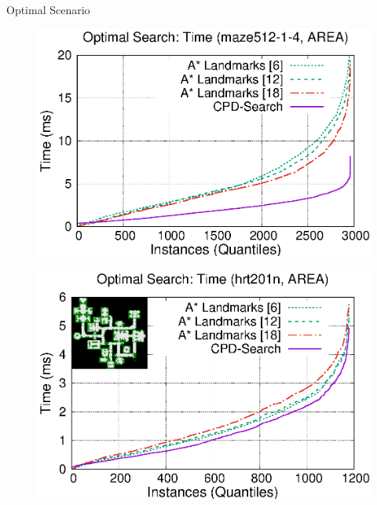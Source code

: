 \begin{frame}{Optimal Scenario}
    \begin{adjustwidth}{-2.5em}{-2.5em}
        \begin{minipage}{0.59\textwidth}
            \begin{figure}
                \centering
                \includegraphics[width=1.0\textwidth]{src/images/optimal/maze512-1-4}
                \label{fig:optimal-maze512-1-4}
            \end{figure}
        \end{minipage}%
        \begin{minipage}{0.59\textwidth}
            \begin{figure}
                \centering
                \includegraphics[width=1.0\textwidth]{src/images/optimal/hrt201n}
                \label{fig:optimal-hrt201n}
            \end{figure}
        \end{minipage}
    \end{adjustwidth}
\end{frame}

